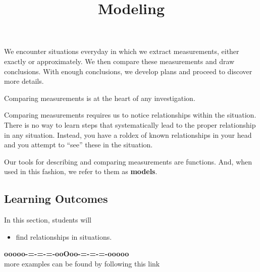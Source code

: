 \documentclass{ximera}
\title{Modeling}
\begin{document}
\begin{abstract}
\end{abstract}
\maketitle





We encounter situations everyday in which we extract measurements, either exactly or approximately. We then compare these measurements and draw conclusions.  With enough conclusions, we develop plans and proceed to discover more details.


Comparing measurements is at the heart of any investigation.

Comparing measurements requires us to notice relationships within the situation.  There is no way to learn steps that systematically lead to the proper relationship in any situation.  Instead, you have a roldex of known relationships in your head and you attempt to ``see'' these in the situation.



Our tools for describing and comparing measurements are functions.  And, when used in this fashion, we refer to them as \textbf{models}.

























\subsection*{Learning Outcomes}


\begin{sectionOutcomes}
In this section, students will 

\begin{itemize}
\item find relationships in situations.
\end{itemize}
\end{sectionOutcomes}














\begin{center}
\textbf{\textcolor{green!50!black}{ooooo-=-=-=-ooOoo-=-=-=-ooooo}} \\

more examples can be found by following this link\\ 

\end{center}
\end{document}
